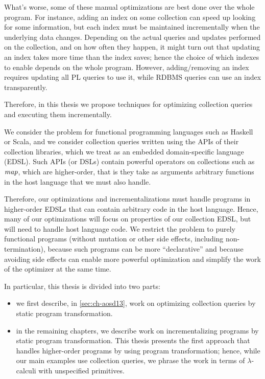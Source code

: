 \documentclass{book}
\begin{document}
What's worse, some of these manual optimizations are best done over the whole
program. For instance, adding an index on some collection can speed up looking
for some information, but each index must be maintained incrementally when the
underlying data changes. Depending on the actual queries and updates performed
on the collection, and on how often they happen, it might turn out that updating
an index takes more time than the index saves; hence the choice of which indexes
to enable depends on the whole program. However, adding/removing an index
requires updating all PL queries to use it, while RDBMS queries can use an index
transparently.

Therefore, in this thesis we propose techniques for optimizing collection
queries and executing them incrementally.

We consider the problem for functional programming languages such as Haskell or
Scala, and we consider collection queries written using the APIs of their
collection libraries, which we treat as an embedded domain-specific language (EDSL). Such
APIs (or DSLs) contain powerful operators on collections such as $\mathit{map}$, which are higher-order, that
is they take as arguments arbitrary functions in the host language that we must
also handle.

Therefore, our optimizations and incrementalizations must handle programs in
higher-order EDSLs that can contain arbitrary code in the host language. Hence,
many of our optimizations will focus on properties of our collection EDSL, but
will need to handle host language code. We restrict the problem to purely
functional programs (without mutation or other side effects, including
non-termination), because such programs can be more ``declarative'' and because
avoiding side effects can enable more powerful optimization and simplify the
work of the optimizer at the same time.

In particular, this thesis is divided into two parts:
\begin{itemize}
\item we first describe, in \cref{sec:ch-aosd13}, work on optimizing collection queries by static program transformation.
\item in the remaining chapters, we describe work on incrementalizing programs
  by static program transformation. This thesis presents the first approach that
  handles higher-order programs by using program transformation; hence, while
  our main examples use collection queries, we phrase the work in terms of
  $\lambda$-calculi with unspecified primitives.
\end{itemize}
\end{document}
